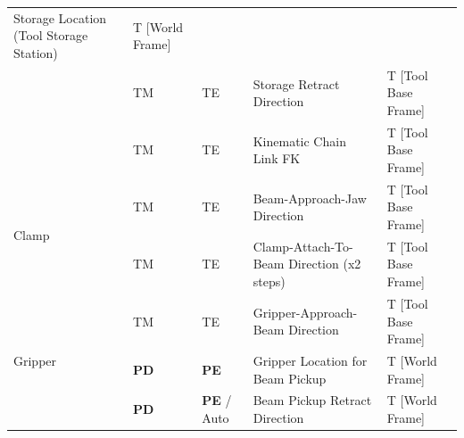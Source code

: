 \documentclass[11pt]{book}
\begin{document}
\begin{table}[H]
\begin{adjustbox}{max width=\textwidth}
\begin{tabular}{p{2.09cm}p{1.51cm}p{1.93cm}p{5.92cm}p{4.48cm}}
\multicolumn{1}{|p{5.92cm}}{{\footnotesize Storage Location (Tool Storage Station)}} & 
\multicolumn{1}{|p{4.48cm}|}{{\footnotesize T [World Frame]}} \\ 
\hhline{~----}
\multicolumn{1}{|p{2.09cm}}{} & 
\multicolumn{1}{|p{1.51cm}}{{\footnotesize TM}} & 
\multicolumn{1}{|p{1.93cm}}{{\footnotesize TE}} & 
\multicolumn{1}{|p{5.92cm}}{{\footnotesize Storage Retract Direction}} & 
\multicolumn{1}{|p{4.48cm}|}{{\footnotesize T [Tool Base Frame]}} \\ 
\hhline{~----}
\multicolumn{1}{|p{2.09cm}}{} & 
\multicolumn{1}{|p{1.51cm}}{{\footnotesize TM}} & 
\multicolumn{1}{|p{1.93cm}}{{\footnotesize TE}} & 
\multicolumn{1}{|p{5.92cm}}{{\footnotesize Kinematic Chain Link FK }} & 
\multicolumn{1}{|p{4.48cm}|}{{\footnotesize T [Tool Base Frame]}} \\ 
\hline
\multicolumn{1}{|p{2.09cm}}{\multirow{2}{*}{\parbox{2.09cm}{{\footnotesize Clamp}}}} & 
\multicolumn{1}{|p{1.51cm}}{{\footnotesize TM}} & 
\multicolumn{1}{|p{1.93cm}}{{\footnotesize TE}} & 
\multicolumn{1}{|p{5.92cm}}{{\footnotesize Beam-Approach-Jaw Direction }} & 
\multicolumn{1}{|p{4.48cm}|}{{\footnotesize T [Tool Base Frame]}} \\ 
\hhline{~----}
\multicolumn{1}{|p{2.09cm}}{} & 
\multicolumn{1}{|p{1.51cm}}{{\footnotesize TM}} & 
\multicolumn{1}{|p{1.93cm}}{{\footnotesize TE}} & 
\multicolumn{1}{|p{5.92cm}}{{\footnotesize Clamp-Attach-To-Beam Direction (x2 steps)}} & 
\multicolumn{1}{|p{4.48cm}|}{{\footnotesize T [Tool Base Frame]}} \\ 
\hline
\multicolumn{1}{|p{2.09cm}}{\multirow{3}{*}{\parbox{2.09cm}{{\footnotesize Gripper}}}} & 
\multicolumn{1}{|p{1.51cm}}{{\footnotesize TM}} & 
\multicolumn{1}{|p{1.93cm}}{{\footnotesize TE}} & 
\multicolumn{1}{|p{5.92cm}}{{\footnotesize Gripper-Approach-Beam Direction}} & 
\multicolumn{1}{|p{4.48cm}|}{{\footnotesize T [Tool Base Frame]}} \\ 
\hhline{~----}
\multicolumn{1}{|p{2.09cm}}{} & 
\multicolumn{1}{|p{1.51cm}}{{\footnotesize \textbf{PD}}} & 
\multicolumn{1}{|p{1.93cm}}{{\footnotesize \textbf{PE}}} & 
\multicolumn{1}{|p{5.92cm}}{{\footnotesize Gripper Location for Beam Pickup}} & 
\multicolumn{1}{|p{4.48cm}|}{{\footnotesize T [World Frame]}} \\ 
\hhline{~----}
\multicolumn{1}{|p{2.09cm}}{} & 
\multicolumn{1}{|p{1.51cm}}{{\footnotesize \textbf{PD}}} & 
\multicolumn{1}{|p{1.93cm}}{{\footnotesize \textbf{PE }/ Auto}} & 
\multicolumn{1}{|p{5.92cm}}{{\footnotesize Beam Pickup Retract Direction}} & 
\multicolumn{1}{|p{4.48cm}|}{{\footnotesize T [World Frame]}} \\ 

\end{tabular}
\end{adjustbox}
\end{table}
\end{document}
